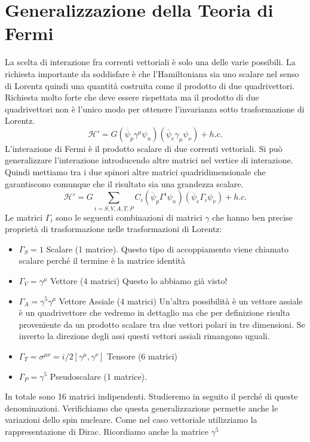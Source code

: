 \section{Generalizzazione della Teoria di Fermi}
La scelta di interazione fra correnti vettoriali è solo una delle varie possibili. La richiesta importante da soddisfare è che l'Hamiltoniana sia uno scalare nel senso di Lorentz quindi una quantità costruita come il prodotto di due quadrivettori. Richiesta molto forte che deve essere rispettata ma il prodotto di due quadrivettori non è l'unico modo per ottenere l'invarianza sotto trasformazione di Lorentz. 
$$
\mathcal{H}' = G (\overline{\psi}_p \gamma^\mu \psi_n) (\overline{\psi}_e \gamma_\mu \psi_\nu) + h.c.
$$
L'interazione di Fermi è il prodotto scalare di due correnti vettoriali. Si può generalizzare l'interazione introducendo altre matrici nel vertice di interazione. Quindi mettiamo tra i due spinori altre matrici quadridimensionale che garantiscono comunque che il risultato sia una grandezza scalare.
$$
\mathcal{H}' = G \sum_{i=S,V,A,T,P} C_i (\overline{\psi}_p \Gamma^i \psi_n) (\overline{\psi}_e \Gamma_i \psi_\nu) + h.c.
$$
Le matrici $\Gamma_i$ sono le seguenti combinazioni di matrici $\gamma$ che hanno ben precise proprietà di trasformazione nelle trasformazioni di Lorentz:
\begin{itemize}
    \item $\Gamma_S=1$ Scalare (1 matrice). Questo tipo di accoppiamento viene chiamato scalare perché il termine è la matrice identità
    \item $\Gamma_V=\gamma^\mu$ Vettore (4 matrici) Questo lo abbiamo già visto!
    \item $\Gamma_A=\gamma^5\gamma^\mu$ Vettore Assiale (4 matrici) Un'altra possibilità è un vettore assiale è un quadrivettore che vedremo in dettaglio ma che per definizione risulta proveniente da un prodotto scalare tra due vettori polari in tre dimensioni. Se inverto la direzione degli assi questi vettori assiali rimangono uguali.
    \item $\Gamma_T=\sigma^{\mu\nu}=i/2[\gamma^\mu,\gamma^\nu]$ Tensore (6 matrici)
    \item $\Gamma_P=\gamma^5$ Pseudoscalare (1 matrice).
\end{itemize}
In totale sono 16 matrici indipendenti. Studieremo in seguito il perché di queste denominazioni. Verifichiamo che questa generalizzazione permette anche le variazioni dello spin nucleare. Come nel caso vettoriale utilizziamo la rappresentazione di Dirac. Ricordiamo anche la matrice $\gamma^5$
